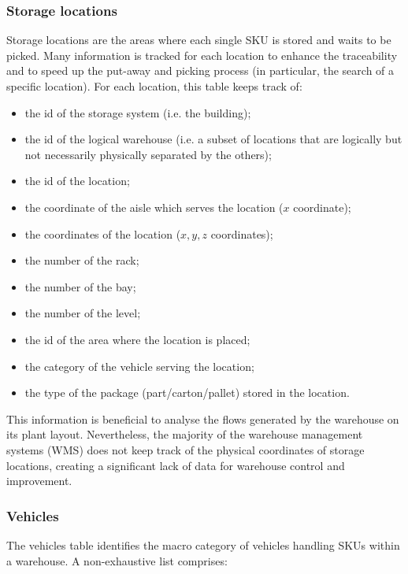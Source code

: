 \subsubsection{Storage locations}

Storage locations are the areas where each single SKU is stored and waits to be picked. Many information is tracked for each location to enhance the traceability and to speed up the put-away and picking process (in particular, the search of a specific location). For each location, this table keeps track of:

\begin{itemize}
    \item the id of the storage system (i.e. the building);
    \item the id of the logical warehouse (i.e. a subset of locations that are logically but not necessarily physically separated by the others);
    \item the id of the location;
    \item the coordinate of the aisle which serves the location ($x$ coordinate);
    \item the coordinates of the location ($x,y,z$ coordinates);
    \item the number of the rack;
    \item the number of the bay;
    \item the number of the level;
    \item the id of the area where the location is placed;
    \item the category of the vehicle serving the location;
    \item the type of the package (part/carton/pallet) stored in the location.

\end{itemize}

This information is beneficial to analyse the flows generated by the warehouse on its plant layout. Nevertheless, the majority of the warehouse management systems (WMS) does not keep track of the physical coordinates of storage locations, creating a significant lack of data for warehouse control and improvement.

\subsubsection{Vehicles}
The vehicles table identifies the macro category of vehicles handling SKUs within a warehouse. A non-exhaustive list comprises:

